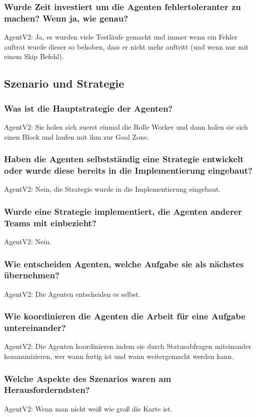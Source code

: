 \documentclass[runningheads]{llncs}
\begin{document}
\subsubsection{Wurde Zeit investiert um die Agenten fehlertoleranter zu machen? Wenn ja, wie genau?\\}
AgentV2: Ja, es wurden viele Testläufe gemacht und immer wenn ein Fehler auftrat wurde dieser so behoben, dass er nicht mehr auftritt (und wenn nur mit einem Skip Befehl).
\subsection{Szenario und Strategie}
\subsubsection{Was ist die Hauptstrategie der Agenten?\\}
AgentV2: Sie holen sich zuerst einmal die Rolle Worker und dann holen sie sich einen Block und laufen mit ihm zur Goal Zone.
\subsubsection{Haben die Agenten selbstständig eine Strategie entwickelt oder wurde diese bereits in die Implementierung eingebaut?\\}
AgentV2: Nein, die Strategie wurde in die Implementierung eingebaut.
\subsubsection{Wurde eine Strategie implementiert, die Agenten anderer Teams mit einbezieht?\\}
AgentV2: Nein.
\subsubsection{Wie entscheiden Agenten, welche Aufgabe sie als nächstes übernehmen?\\}
AgentV2: Die Agenten entscheiden es selbst.
\subsubsection{Wie koordinieren die Agenten die Arbeit für eine Aufgabe untereinander?\\}
AgentV2: Die Agenten koordinieren indem sie durch Statusabfragen miteinander kommunizieren, wer wann fertig ist und wann weitergemacht werden kann. 
\subsubsection{Welche Aspekte des Szenarios waren am Herausforderndsten?\\}
AgentV2: Wenn man nicht weiß wie groß die Karte ist.
\end{document}

